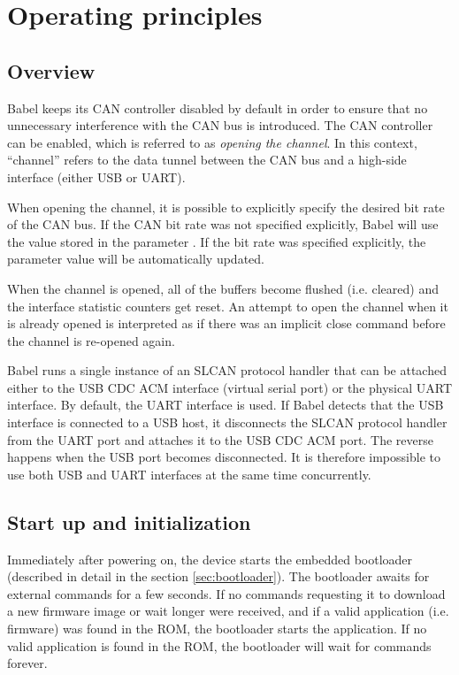 \documentclass{zubaxdoc}
\begin{document}
\chapter{Operating principles}

\section{Overview}

Babel keeps its CAN controller disabled by default in order to ensure that no unnecessary
interference with the CAN bus is introduced.
The CAN controller can be enabled, which is referred to as \emph{opening the channel}.
In this context, ``channel'' refers to the data tunnel between the CAN bus and a high-side
interface (either USB or UART).

When opening the channel, it is possible to explicitly specify the desired bit rate of the CAN bus.
If the CAN bit rate was not specified explicitly, Babel will use the value stored in the parameter
.
If the bit rate was specified explicitly, the parameter value will be automatically updated.

When the channel is opened, all of the buffers become flushed (i.e. cleared)
and the interface statistic counters get reset.
An attempt to open the channel when it is already opened is interpreted as if there was an implicit
close command before the channel is re-opened again.

Babel runs a single instance of an SLCAN protocol handler that can be attached either to the
USB CDC ACM interface (virtual serial port) or the physical UART interface.
By default, the UART interface is used.
If Babel detects that the USB interface is connected to a USB host,
it disconnects the SLCAN protocol handler from the UART port and attaches it to the USB CDC ACM port.
The reverse happens when the USB port becomes disconnected.
It is therefore impossible to use both USB and UART interfaces at the same time concurrently.

\section{Start up and initialization}

Immediately after powering on, the device starts the embedded bootloader (described in detail in the section
\ref{sec:bootloader}).
The bootloader awaits for external commands for a few seconds.
If no commands requesting it to download a new firmware image or wait longer were received,
and if a valid application (i.e. firmware) was found in the ROM,
the bootloader starts the application.
If no valid application is found in the ROM, the bootloader will wait for commands forever.
\end{document}

